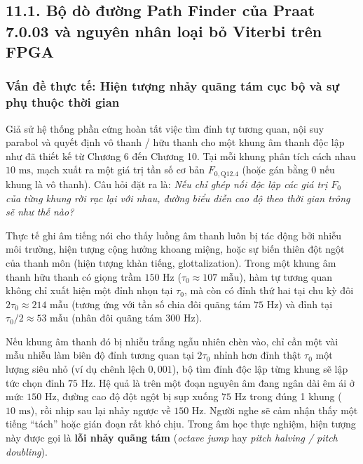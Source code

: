 \subsection*{11.1. Bộ dò đường Path Finder của Praat 7.0.03 và nguyên nhân loại bỏ Viterbi trên FPGA}

\subsubsection*{Vấn đề thực tế: Hiện tượng nhảy quãng tám cục bộ và sự phụ thuộc thời gian}
Giả sử hệ thống phần cứng hoàn tất việc tìm đỉnh tự tương quan, nội suy parabol và quyết định vô thanh / hữu thanh cho một khung âm thanh độc lập như đã thiết kế từ Chương 6 đến Chương 10. Tại mỗi khung phân tích cách nhau $10\text{ ms}$, mạch xuất ra một giá trị tần số cơ bản $F_{0,\text{Q12.4}}$ (hoặc gán bằng $0$ nếu khung là vô thanh). Câu hỏi đặt ra là: \emph{Nếu chỉ ghép nối độc lập các giá trị $F_0$ của từng khung rời rạc lại với nhau, đường biểu diễn cao độ theo thời gian trông sẽ như thế nào?}

Thực tế ghi âm tiếng nói cho thấy luồng âm thanh luôn bị tác động bởi nhiễu môi trường, hiện tượng cộng hưởng khoang miệng, hoặc sự biến thiên đột ngột của thanh môn (hiện tượng khàn tiếng, glottalization). Trong một khung âm thanh hữu thanh có giọng trầm $150\text{ Hz}$ ($\tau_0 \approx 107\text{ mẫu}$), hàm tự tương quan không chỉ xuất hiện một đỉnh nhọn tại $\tau_0$, mà còn có đỉnh thứ hai tại chu kỳ đôi $2\tau_0 \approx 214\text{ mẫu}$ (tương ứng với tần số chia đôi quãng tám $75\text{ Hz}$) và đỉnh tại $\tau_0 / 2 \approx 53\text{ mẫu}$ (nhân đôi quãng tám $300\text{ Hz}$).

Nếu khung âm thanh đó bị nhiễu trắng ngẫu nhiên chèn vào, chỉ cần một vài mẫu nhiễu làm biên độ đỉnh tương quan tại $2\tau_0$ nhỉnh hơn đỉnh thật $\tau_0$ một lượng siêu nhỏ (ví dụ chênh lệch $0{,}001$), bộ tìm đỉnh độc lập từng khung sẽ lập tức chọn đỉnh $75\text{ Hz}$. Hệ quả là trên một đoạn nguyên âm đang ngân dài êm ái ở mức $150\text{ Hz}$, đường cao độ đột ngột bị sụp xuống $75\text{ Hz}$ trong đúng 1 khung ($10\text{ ms}$), rồi nhịp sau lại nhảy ngược về $150\text{ Hz}$. Người nghe sẽ cảm nhận thấy một tiếng ``tách'' hoặc gián đoạn rất khó chịu. Trong âm học thực nghiệm, hiện tượng này được gọi là \textbf{lỗi nhảy quãng tám} (\emph{octave jump} hay \emph{pitch halving / pitch doubling}).


